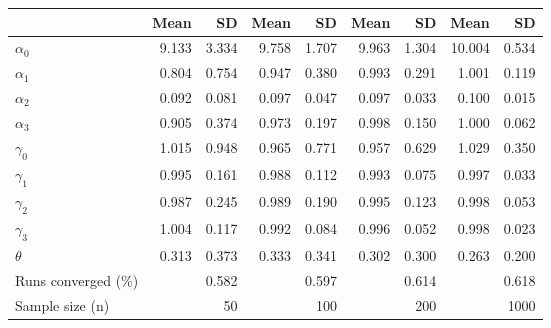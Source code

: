 
\begin{tabular}[t]{lrrrrrrrr}
\toprule
  & Mean & SD & Mean  & SD  & Mean   & SD   & Mean    & SD   \\
\midrule
$\alpha_{0}$ & 9.133 & 3.334 & 9.758 & 1.707 & 9.963 & 1.304 & 10.004 & 0.534\\
$\alpha_{1}$ & 0.804 & 0.754 & 0.947 & 0.380 & 0.993 & 0.291 & 1.001 & 0.119\\
$\alpha_{2}$ & 0.092 & 0.081 & 0.097 & 0.047 & 0.097 & 0.033 & 0.100 & 0.015\\
$\alpha_{3}$ & 0.905 & 0.374 & 0.973 & 0.197 & 0.998 & 0.150 & 1.000 & 0.062\\
$\gamma_{0}$ & 1.015 & 0.948 & 0.965 & 0.771 & 0.957 & 0.629 & 1.029 & 0.350\\
$\gamma_{1}$ & 0.995 & 0.161 & 0.988 & 0.112 & 0.993 & 0.075 & 0.997 & 0.033\\
$\gamma_{2}$ & 0.987 & 0.245 & 0.989 & 0.190 & 0.995 & 0.123 & 0.998 & 0.053\\
$\gamma_{3}$ & 1.004 & 0.117 & 0.992 & 0.084 & 0.996 & 0.052 & 0.998 & 0.023\\
$\theta$ & 0.313 & 0.373 & 0.333 & 0.341 & 0.302 & 0.300 & 0.263 & 0.200\\
Runs converged (\%) &  & 0.582 &  & 0.597 &  & 0.614 &  & 0.618\\
Sample size (n) &  & 50 &  & 100 &  & 200 &  & 1000\\
\bottomrule
\end{tabular}
